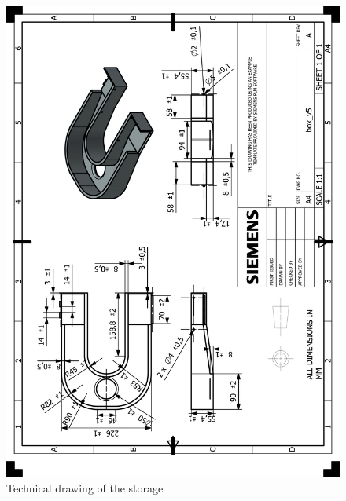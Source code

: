 \documentclass[12pt]{article}
\begin{document}
\begin{appendices}
\begin{figure}[H]
    \centering
    \includegraphics[width=\textwidth]{HP_box_v5.png} 
    \caption{Technical drawing of the storage}
    \label{fig:technical-drawing}
\end{figure}


\end{appendices}
\end{document}
